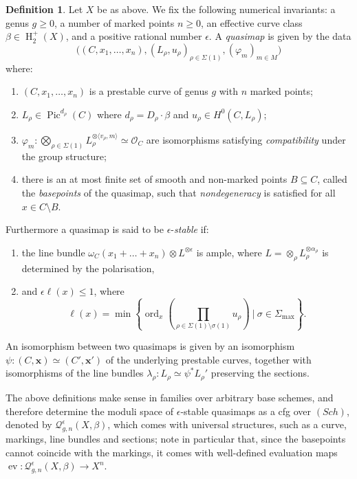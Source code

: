\documentclass[11pt]{amsart}
\newcommand{\Qe}[4]{\mathcal{Q}^{\epsilon}_{#1,#2}(#3,#4)}
\newcommand{\OO}{\mathcal{O}}
\renewcommand{\to}{\rightarrow}
\newcommand{\Pic}{\operatorname{Pic}}
\newcommand{\HH}{\operatorname{H}}
\newcommand{\ev}{\operatorname{ev}}
\theoremstyle{definition}
\theoremstyle{definition}
\newtheorem{definition}[thm]{Definition}
\newcommand{\ilemph}[1]{\emph{#1}}
\begin{document}
\begin{definition}\cite[Definition 3.1.1]{CF-K} Let $X$ be as above. We fix the following numerical invariants: a genus $g \geq 0$, a number of marked points $n \geq 0$, an effective curve class $\beta \in \HH_2^+(X)$, and a positive rational number $\epsilon$. A \ilemph{quasimap} is given by the data
\begin{equation*} \Big((C,x_1,\ldots,x_n), (L_\rho,u_\rho)_{\rho \in \Sigma(1)}, (\varphi_m)_{m \in M}\Big) \end{equation*}
where:
\begin{enumerate}
\item $(C,x_1,\ldots,x_n)$ is a prestable curve of genus $g$ with $n$ marked points;
\item $L_\rho\in\Pic^{d_\rho}(C)$  where $d_\rho = D_\rho \cdot \beta$ and $u_\rho\in H^0(C,L_\rho)$;
\item $\varphi_m \colon \bigotimes_{\rho \in \Sigma(1)} L_\rho^{\otimes \langle v_\rho, m \rangle} \simeq \OO_C$ are isomorphisms satisfying \ilemph{compatibility} under the group structure;
\item there is an at most finite set of smooth and non-marked points $B \subseteq C$, called the \ilemph{basepoints} of the quasimap, such that \ilemph{nondegeneracy} is satisfied for all $x \in C \setminus B$.
\end{enumerate}
Furthermore a quasimap is said to be $\epsilon$-\ilemph{stable} if:
\begin{enumerate}[resume]
 \item the line bundle $ \omega_C(x_1 + \ldots + x_n)\otimes L^{\otimes \epsilon}$ is ample, where $L = \otimes_\rho L_\rho^{\otimes \alpha_\rho}$ is determined by the polarisation,
 \item and $\epsilon \ell(x)\leq 1$, where
\[\ell(x)=\min\left\{\operatorname{ord}_x\left(\prod_{\rho\in\Sigma(1)\setminus \sigma(1)}u_\rho\right)\ |\ \sigma\in\Sigma_{\operatorname{max}}\right\}.\]
\end{enumerate}
An isomorphism between two quasimaps is given by an isomorphism $\psi\colon (C,\mathbf x)\simeq(C',\mathbf x')$ of the underlying prestable curves, together with isomorphisms of the line bundles $\lambda_\rho\colon L_\rho\simeq \psi^* L_\rho'$ preserving the sections.
\end{definition}

The above definitions make sense in families over arbitrary base schemes, and therefore determine the moduli space of $\epsilon$-stable quasimaps as a cfg over $(Sch)$, denoted by $\Qe{g}{n}{X}{\beta}$, which comes with universal structures, such as a curve, markings, line bundles and sections; note in particular that, since the basepoints cannot coincide with the markings, it comes with well-defined evaluation maps $\ev\colon \Qe{g}{n}{X}{\beta}\to X^n$.
\end{document}
